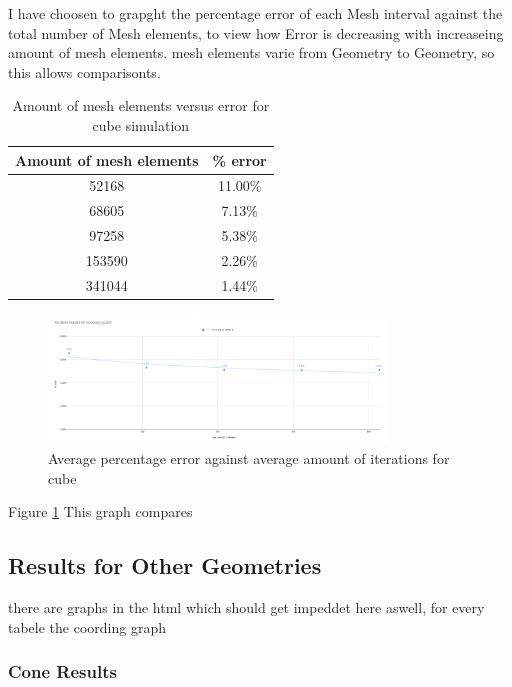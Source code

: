 \documentclass[12pt,a4paper]{article}
\begin{document}
I have choosen to grapght the percentage error of each Mesh interval against the total number of Mesh elements, to view how Error is decreasing with increaseing amount of mesh elements. mesh elements varie from Geometry to Geometry, so this allows comparisonts.

\begin{table}[H]
\centering
\caption{Amount of mesh elements versus error for cube simulation}
\label{tab:cube_elements_error}
\begin{tabular}{|c|c|}
\hline
\rowcolor{lightblue}
\textbf{Amount of mesh elements} & \textbf{\% error} \\
\hline
52168 & 11.00\% \\
\hline
68605 & 7.13\% \\
\hline
97258 & 5.38\% \\
\hline
153590 & 2.26\% \\
\hline
341044 & 1.44\% \\
\hline
\end{tabular}
\end{table}

\begin{figure}[H]
    \centering
    \includegraphics[width=0.8\textwidth]{image13.png}
    \caption{Average percentage error against average amount of iterations for cube}
    \label{fig:cube_iterations_error}
\end{figure}

Figure \ref{fig:cube_iterations_error} This graph compares 

\subsection{Results for Other Geometries}

there are graphs in the html which should get impeddet here aswell, for every tabele the coording graph

\subsubsection{Cone Results}
\end{document}
